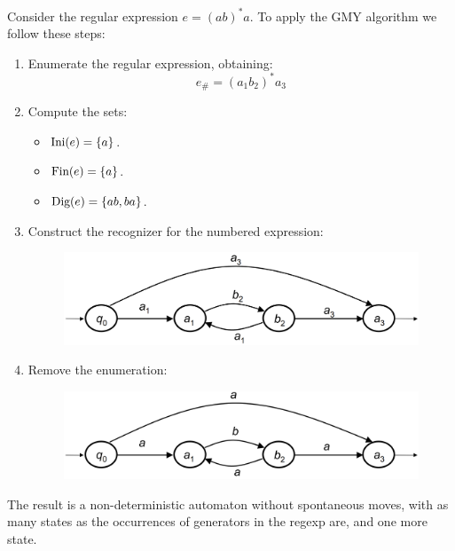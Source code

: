 \begin{example}
    Consider the regular expression $e=(ab)^{*}a$.
    To apply the GMY algorithm we follow these steps: 
    \begin{enumerate}
        \item Enumerate the regular expression, obtaining: 
            \[e_{\#}=(a_1b_2)^{*}a_3\]
        \item Compute the sets:
            \begin{itemize}
                \item $\textnormal{Ini}(e)=\{a\}$.
                \item $\textnormal{Fin}(e)=\{a\}$.
                \item $\textnormal{Dig}(e)=\{ab,ba\}$.
            \end{itemize}
        \item Construct the recognizer for the numbered expression: 
            \begin{figure}[H]
                \centering
                \includegraphics[width=0.5\linewidth]{images/gmy1.png}
            \end{figure}
        \item Remove the enumeration: 
            \begin{figure}[H]
                \centering
                \includegraphics[width=0.5\linewidth]{images/gmy2.png}
            \end{figure}
    \end{enumerate}
    The result is a non-deterministic automaton without spontaneous moves, with as many states as the occurrences of generators in the regexp are, and one more state. 
\end{example}

